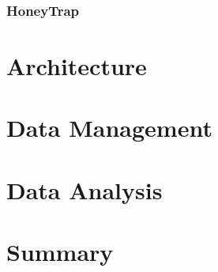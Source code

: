 \subsubsection{HoneyTrap}

\section{Architecture}


\section{Data Management}

\section{Data Analysis}

\section{Summary}
